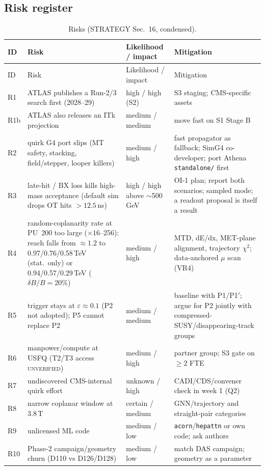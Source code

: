 \documentclass[11pt,a4paper]{article}
\newcommand{\UNV}{\textsc{unverified}}
\begin{document}
\subsection{Risk register}
{\small
\begin{longtable}{@{}L{0.82cm}L{6.73cm}L{2.45cm}L{6.12cm}@{}}
\caption{Risks (STRATEGY Sec.~16, condensed).}\label{tab:risk}\\
\toprule ID & Risk & Likelihood / impact & Mitigation\\\midrule\endfirsthead
\toprule ID & Risk & Likelihood / impact & Mitigation\\\midrule\endhead
\bottomrule\endfoot
R1 & ATLAS publishes a Run-2/3 search first (2028--29) & high / high (S2) & S3 staging; CMS-specific assets\\
R1b & ATLAS also releases an ITk projection & medium / medium & move fast on S1 Stage B\\
R2 & quirk G4 port slips (MT safety, stacking, field/stepper, looper killers) & medium / high & fast propagator as fallback; SimG4 co-developer; port Athena \texttt{standalone/} first\\
R3 & late-hit / BX loss kills high-mass acceptance (default sim drops OT hits $>12.5$\,ns) & high / high above $\sim$500\,GeV & OI-1 plan; report both scenarios; sampled mode; a readout proposal is itself a result\\
R4 & random-coplanarity rate at PU~200 too large ($\times16$--256): reach falls from $\approx1.2$ to 0.97/0.76/0.58\,TeV (stat.\ only) or 0.94/0.57/0.29\,TeV ($\delta B/B=20\%$) & medium / high & MTD, dE/dx, MET-plane alignment, trajectory $\chi^2$; data-anchored $\mu$ scan (VR4)\\
R5 & trigger stays at $\varepsilon\approx0.1$ (P2 not adopted); P5 cannot replace P2 & medium / medium & baseline with P1/P1$'$; argue for P2 jointly with compressed-SUSY/disappearing-track groups\\
R6 & manpower/compute at USFQ (T2/T3 access \UNV) & medium / high & partner group; S3 gate on $\geq2$ FTE\\
R7 & undiscovered CMS-internal quirk effort & unknown / high & CADI/CDS/convener check in week 1 (Q2)\\
R8 & narrow coplanar window at 3.8\,T & certain / medium & GNN/trajectory and straight-pair categories\\
R9 & unlicensed ML code & medium / low & \texttt{acorn}/\texttt{hepattn} or own code; ask authors\\
R10 & Phase-2 campaign/geometry churn (D110 vs D126/D128) & medium / low & match DAS campaign; geometry as a parameter\\

\end{longtable}}
\end{document}
